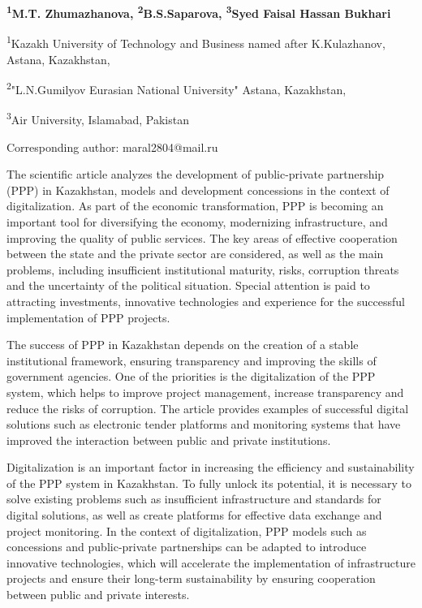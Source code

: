 
\begin{articleheader}

{\bfseries
\textsuperscript{1}M.T. Zhumazhanova\textsuperscript{\envelope },
\textsuperscript{2}B.S.Saparova,
\textsuperscript{3}Syed Faisal Hassan Bukhari
}
\end{articleheader}

\begin{affiliation}
\textsuperscript{1}Kazakh University of Technology and Business named after K.Kulazhanov, Astana, Kazakhstan,

\textsuperscript{2}"L.N.Gumilyov Eurasian National University" Astana, Kazakhstan,

\textsuperscript{3}Air University, Islamabad, Pakistan

\raggedright \textsuperscript{\envelope }Corresponding author: maral2804@mail.ru
\end{affiliation}

The scientific article analyzes the development of public-private
partnership (PPP) in Kazakhstan, models and development concessions in
the context of digitalization. As part of the economic transformation,
PPP is becoming an important tool for diversifying the economy,
modernizing infrastructure, and improving the quality of public
services. The key areas of effective cooperation between the state and
the private sector are considered, as well as the main problems,
including insufficient institutional maturity, risks, corruption threats
and the uncertainty of the political situation. Special attention is
paid to attracting investments, innovative technologies and experience
for the successful implementation of PPP projects.

The success of PPP in Kazakhstan depends on the creation of a stable
institutional framework, ensuring transparency and improving the skills
of government agencies. One of the priorities is the digitalization of
the PPP system, which helps to improve project management, increase
transparency and reduce the risks of corruption. The article provides
examples of successful digital solutions such as electronic tender
platforms and monitoring systems that have improved the interaction
between public and private institutions.

Digitalization is an important factor in increasing the efficiency and
sustainability of the PPP system in Kazakhstan. To fully unlock its
potential, it is necessary to solve existing problems such as
insufficient infrastructure and standards for digital solutions, as well
as create platforms for effective data exchange and project monitoring.
In the context of digitalization, PPP models such as concessions and
public-private partnerships can be adapted to introduce innovative
technologies, which will accelerate the implementation of infrastructure
projects and ensure their long-term sustainability by ensuring
cooperation between public and private interests.

